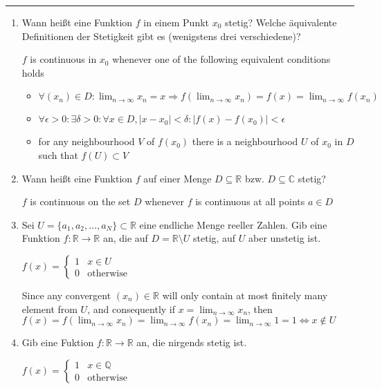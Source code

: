 \documentclass[11pt]{article}
\begin{document}


\medskip\hrule
\begin{enumerate}

\item Wann heißt eine Funktion $f$ in einem Punkt $x_0$ stetig? Welche äquivalente Definitionen der Stetigkeit gibt es (wenigstens drei verschiedene)?

$f$ is continuous in $x_0$ whenever one of the following equivalent conditions holds
\begin{itemize}
    \item $\forall (x_n) \in D\colon \lim_{n\to\infty}{x_n} = x \Rightarrow f(\lim_{n\to\infty}{x_n}) = f(x) = \lim_{n\to\infty}{f(x_n)}$
    \item $\forall \epsilon > 0\colon \exists \delta > 0\colon \forall x \in D, | x - x_0| < \delta\colon |f(x) - f(x_0)| < \epsilon$
    \item for any neighbourhood $V$ of $f(x_0)$ there is a neighbourhood $U$ of $x_0$ in $D$ such that $f(U) \subset V$
\end{itemize}

\item Wann heißt eine Funktion $f$ auf einer Menge $D \subseteq \mathbb{R}$ bzw. $D \subseteq \mathbb{C}$ stetig?

$f$ is continuous on the set $D$ whenever $f$ is continuous at all points $a \in D$

\item Sei $U = \{a_1, a_2, \dots, a_N \} \subset \mathbb{R}$ eine endliche Menge reeller Zahlen. Gib eine Funktion
$f\colon \mathbb{R} \to \mathbb{R}$ an, die auf $D = \mathbb{R} \setminus U$ stetig, auf $U$ aber unstetig ist.

$f(x) = \begin{cases}
    1& x \in U\\
    0&\text{otherwise}
\end{cases}$

Since any convergent $(x_n) \in \mathbb{R}$ will only contain at most finitely many element from $U$, and consequently if $x = \lim_{n \to \infty} x_n$, then $f(x) = f(\lim_{n \to \infty} x_n) = \lim_{n \to \infty} f(x_n) = \lim_{n \to \infty} 1 = 1 \Leftrightarrow x \notin U$

\item Gib eine Fuktion $f\colon \mathbb{R} \to \mathbb{R}$ an, die nirgends stetig ist.

$f(x) = \begin{cases}
    1&x\in \mathbb{Q}\\
    0&\text{otherwise}
\end{cases}$


\end{enumerate}
\end{document}
